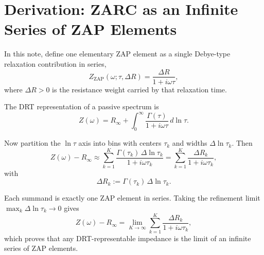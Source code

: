 \documentclass[11pt]{article}
\begin{document}
\section{Derivation: ZARC as an Infinite Series of ZAP Elements}

In this note, define one elementary ZAP element as a single Debye-type relaxation contribution in series,
\begin{equation}
Z_{\mathrm{ZAP}}(\omega;\tau,\Delta R) = \frac{\Delta R}{1+i\omega\tau},
\end{equation}
where $\Delta R>0$ is the resistance weight carried by that relaxation time.

The DRT representation of a passive spectrum is
\begin{equation}
Z(\omega) = R_{\infty} + \int_0^{\infty}\frac{\Gamma(\tau)}{1+i\omega\tau}\,d\ln\tau.
\end{equation}

Now partition the $\ln\tau$ axis into bins with centers $\tau_k$ and widths $\Delta\ln\tau_k$. Then
\begin{equation}
Z(\omega)-R_{\infty}
\approx \sum_{k=1}^{K}\frac{\Gamma(\tau_k)\,\Delta\ln\tau_k}{1+i\omega\tau_k}
=\sum_{k=1}^{K}\frac{\Delta R_k}{1+i\omega\tau_k},
\end{equation}
with
\begin{equation}
\Delta R_k := \Gamma(\tau_k)\,\Delta\ln\tau_k.
\end{equation}

Each summand is exactly one ZAP element in series. Taking the refinement limit $\max_k\Delta\ln\tau_k\to 0$ gives
\begin{equation}
Z(\omega)-R_{\infty}
=\lim_{K\to\infty}\sum_{k=1}^{K}\frac{\Delta R_k}{1+i\omega\tau_k},
\end{equation}
which proves that any DRT-representable impedance is the limit of an infinite series of ZAP elements.
\end{document}

